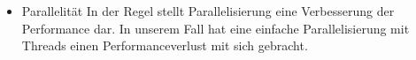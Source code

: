 \begin{itemize}
\item{Parallelität} In der Regel stellt Parallelisierung eine 
Verbesserung der Performance dar. In unserem Fall hat eine einfache 
Parallelisierung mit Threads einen Performanceverlust mit sich gebracht.

\end{itemize}
